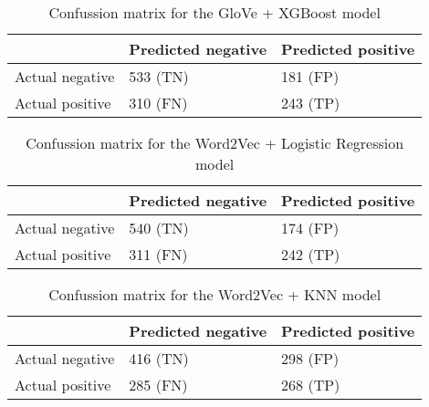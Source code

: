 \begin{table}[H]
\centering
{
\makegapedcells
\begin{tabular}{lll}
                & Predicted negative & Predicted positive \\
\hline
Actual negative & 533 (TN)           & 181 (FP) \\
Actual positive & 310 (FN)           & 243 (TP) \\
\hline
\end{tabular}
}
\caption{Confussion matrix for the GloVe + XGBoost model}
\label{glovexgb_cm}
\end{table}



\begin{table}[H]
\centering
{
\makegapedcells
\begin{tabular}{lll}
                & Predicted negative & Predicted positive \\
\hline
Actual negative & 540 (TN)           & 174 (FP) \\
Actual positive & 311 (FN)           & 242 (TP) \\
\hline
\end{tabular}
}
\caption{Confussion matrix for the Word2Vec + Logistic Regression model}
\label{w2vlr_cm}
\end{table}

\begin{table}[H]
\centering
{
\makegapedcells
\begin{tabular}{lll}
                & Predicted negative & Predicted positive \\
\hline
Actual negative & 416 (TN)           & 298 (FP) \\
Actual positive & 285 (FN)           & 268 (TP) \\
\hline
\end{tabular}
}
\caption{Confussion matrix for the Word2Vec + KNN model}
\label{w2vknn_cm}
\end{table}

